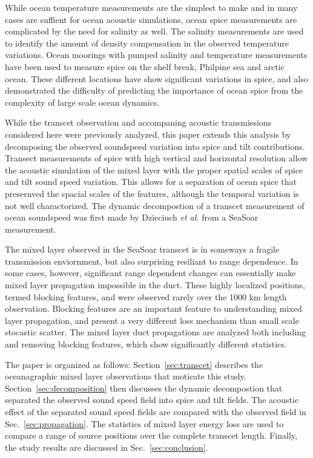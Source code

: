 \documentclass[preprint,NumberedRefs]{JASA}
\begin{document}
While ocean temperature measurements are the simplest to make and in many cases are suffient for ocean acoustic simulations, ocean spice measurements are complicated by the need for salinity as well. The salinity measurements are used to identify the amount of density compensation in the observed temperature variations. Ocean moorings with pumped salinity and temperature measurements have been used to measure spice on the shelf break, Philpine sea and arctic ocean. These different locations have show significant variations in spice, and also demonstrated the difficulty of predicting the importance of ocean spice from the complexity of large scale ocean dynamics.

While the transcet observation and accompaning acoustic transmissions considered here were previously analyzed\citep{colosi2020observations}, this paper extends this analysis by decomposing the observed soundspeed variation into spice and tilt contributions. Transect measurements of spice with high vertical and horizontal resolution allow the acoustic simulation of the mixed layer with the proper spatial scales of spice and tilt sound speed variation. This allows for a separation of ocean spice that presernved the spacial scales of the features, although the temporal variation is not well charactorized. The dynamic decompostion of a transcet measurement of ocean soundspeed was first made by Dzieciuch \emph{et al.}\citep{dzieciuch2004} from a SeaSoar measurement.

The mixed layer observed in the SeaSoar transcet is in someways a fragile transmission enviornment, but also surprising resiliant to range dependence. In some cases, however, significant range dependent changes can essentially make mixed layer propagation impossible in the duct. These highly localized positions, termed blocking features, and were observed rarely over the 1000 km length observation. Blocking features are an important feature to understanding mixed layer propagation, and present a very different loss mechanism than small scale stocastic scatter. The mixed layer duct propagations are analyzed both including and removing blocking features, which show significantly different statistics.

The paper is organized as follows: Section~\ref{sec:transcet} describes the oceanagraphic mixed layer observations that moticate this study. Section~\ref{sec:decomposition} then discusses the dynamic decompostion that separated the observed sound speed field into spice and tilt fields. The acoustic effect of the separated sound speed fields are compared with the observed field in Sec.~\ref{sec:propagation}. The statistics of mixed layer energy loss are used to compare a range of source positions over the complete transcet length. Finally, the study results are discussed in Sec.~\ref{sec:conclusion}.
\end{document}
